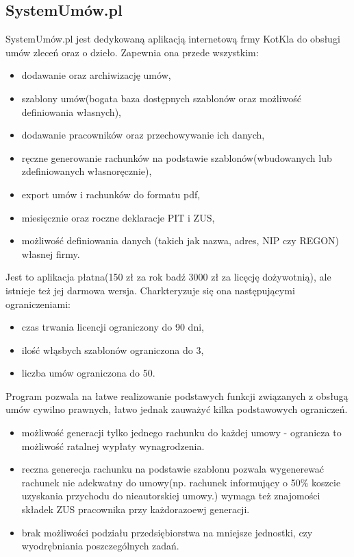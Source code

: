 \subsection[SystemUmów.pl][SystemUmów.pl]{SystemUmów.pl}
SystemUmów.pl jest dedykowaną aplikacją internetową frmy KotKla do obsługi umów zleceń oraz o dzieło. Zapewnia ona przede wszystkim:
\begin{itemize}
	\item dodawanie oraz archiwizację umów,
	\item szablony umów(bogata baza dostępnych szablonów oraz możliwość definiowania własnych),
	\item dodawanie pracowników oraz przechowywanie ich danych,
	\item ręczne generowanie rachunków na podstawie szablonów(wbudowanych lub zdefiniowanych własnoręcznie),
	\item export umów i rachunków do formatu pdf,
	\item miesięcznie oraz roczne deklaracje PIT i ZUS,
	\item możliwość definiowania danych (takich jak nazwa, adres, NIP czy REGON) własnej firmy.
\end{itemize}

Jest to aplikacja płatna(150 zł za rok badź 3000 zł za licęcję dożywotnią), ale istnieje też jej darmowa wersja. Charkteryzuje się ona następującymi ograniczeniami:
\begin{itemize}
	\item czas trwania licencji ograniczony do 90 dni,
	\item ilość włąsbych szablonów ograniczona do 3,
	\item liczba umów ograniczona do 50.
\end{itemize}
Program pozwala na łatwe realizowanie podstawych funkcji związanych z obsługą umów cywilno prawnych, łatwo jednak zauważyć kilka podstawowych ograniczeń.
\begin{itemize}
	\item możliwość generacji tylko jednego rachunku do każdej umowy - ogranicza to możliwość ratalnej wypłaty wynagrodzenia.
	\item reczna generecja rachunku na podstawie szablonu pozwala wygenerewać rachunek nie adekwatny do umowy(np. rachunek informujący o 50\% koszcie uzyskania przychodu do nieautorskiej umowy.) wymaga też znajomości składek ZUS pracownika przy każdorazoewj generacji.
	\item brak możliwości podziału przedsiębiorstwa na mniejsze jednostki, czy wyodrębniania poszczególnych zadań.
\end{itemize}

